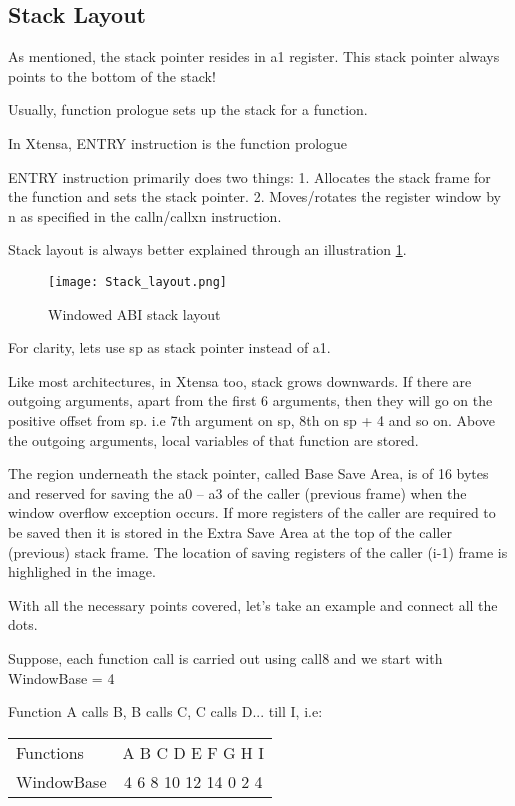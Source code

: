 \subsection{Stack Layout}

As mentioned, the stack pointer resides in a1 register. This stack pointer always points to the bottom of the stack!

Usually, function prologue sets up the stack for a function.

In Xtensa, ENTRY instruction is the function prologue

ENTRY instruction primarily does two things:
1. Allocates the stack frame for the function and sets the stack pointer.
2. Moves/rotates the register window by n as specified in the calln/callxn instruction.

Stack layout is always better explained through an illustration \ref{fig:window-abi-stack-layout}.

\begin{figure}[p]
    \center
    \texttt{[image: Stack\_layout.png]}
    \caption{Windowed ABI stack layout}
    \label{fig:window-abi-stack-layout}
\end{figure}

For clarity, lets use sp as stack pointer instead of a1.

Like most architectures, in Xtensa too, stack grows downwards. If there are outgoing arguments, apart from the first 6 arguments, then they will go on the positive offset from sp. i.e 7th argument on sp, 8th on sp + 4 and so on. Above the outgoing arguments, local variables of that function are stored.

The region underneath the stack pointer, called Base Save Area, is of 16 bytes and reserved for saving the a0 -- a3 of the caller (previous frame) when the window overflow exception occurs. If more registers of the caller are required to be saved then it is stored in the Extra Save Area at the top of the caller (previous) stack frame. The location of saving registers of the caller (i-1) frame is highlighed in the image.

With all the necessary points covered, let’s take an example and connect all the dots.

Suppose, each function call is carried out using call8 and we start with WindowBase = 4

Function A calls B, B calls C, C calls D... till I, i.e:

\newcommand{\calls}{\textrightarrow{}}
\begin{longtable}{lc}
Functions&  A \calls B \calls C \calls D \calls E \calls F \calls G \calls H \calls I\\
WindowBase& 4 \calls 6 \calls 8 \calls 10 \calls 12 \calls 14 \calls 0 \calls 2 \calls 4\\
\end{longtable}
\let\calls\undefined

